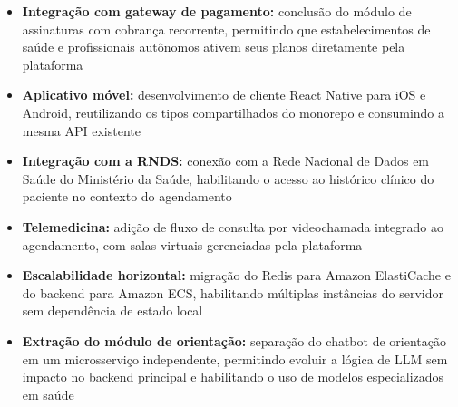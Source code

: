 \begin{itemize}
  \item \textbf{Integração com gateway de pagamento:}
        conclusão do módulo de assinaturas com
        cobrança recorrente, permitindo que estabelecimentos de saúde
        e profissionais autônomos ativem seus planos
        diretamente pela plataforma

  \item \textbf{Aplicativo móvel:} desenvolvimento
        de cliente React Native para iOS e Android,
        reutilizando os tipos compartilhados do
        monorepo e consumindo a mesma API existente

  \item \textbf{Integração com a RNDS:} conexão com
        a Rede Nacional de Dados em Saúde do
        Ministério da Saúde, habilitando o acesso ao
        histórico clínico do paciente no contexto
        do agendamento

  \item \textbf{Telemedicina:} adição de fluxo de
        consulta por videochamada integrado ao
        agendamento, com salas virtuais gerenciadas
        pela plataforma

  \item \textbf{Escalabilidade horizontal:}
        migração do Redis para Amazon ElastiCache e
        do backend para Amazon ECS, habilitando
        múltiplas instâncias do servidor sem
        dependência de estado local

  \item \textbf{Extração do módulo de orientação:}
        separação do chatbot de orientação em um
        microsserviço independente, permitindo
        evoluir a lógica de LLM sem impacto no
        backend principal e habilitando o uso de
        modelos especializados em saúde
\end{itemize}